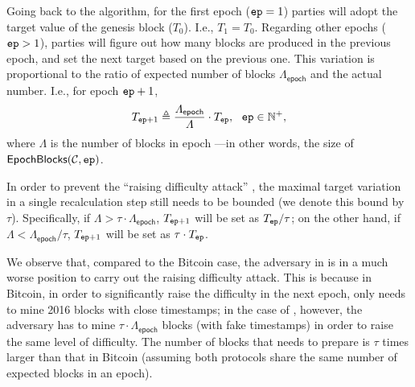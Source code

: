 Going back to the algorithm, for the first epoch ($\mathtt{ep}  = 1$) parties will adopt the target value of the genesis block ($T_0$). I.e., $T_ 1 = T_ 0$.
%
Regarding other epochs ($\mathtt{ep} > 1$), parties will figure out how many blocks are produced in the previous epoch, and set the next target based on the previous one.
%
This variation is proportional to the ratio of expected number of blocks $\varLambda_{\mathsf{epoch}}$ and the actual number.
%
I.e., for epoch $\mathtt{ep} + 1$,
%
\begin{equation} \label{eq:next-target}
    T_{\mathtt{ep} + 1} \triangleq \frac{\varLambda_{\mathsf{epoch}}}{\varLambda} \cdot T_\mathtt{ep}, ~~ \mathtt{ep} \in \mathbb{N}^+,
\end{equation}
%
where $\varLambda$ is the number of blocks in epoch \epoch---in other words, the size of $\mathsf{EpochBlocks}(\mathcal{C}, \mathtt{ep})$.

In order to prevent the ``raising difficulty attack'' \cite{EPRINT:Bahack13}, the maximal target variation in a single recalculation step still needs to be bounded (we denote this bound by $\tau$).
%
Specifically, if $\varLambda > \tau \cdot \varLambda_{\mathsf{epoch}}$, $T_{\mathtt{ep} + 1}$ will be set as $T_\mathtt{ep} / \tau$; on the other hand, if $\varLambda < \varLambda_{\mathsf{epoch}} / \tau$, $T_{\mathtt{ep} + 1}$ will be set as $\tau \cdot T_\mathtt{ep}$.

\begin{remark}
    We observe that, compared to the Bitcoin case, the adversary \adv in \timekeeper is in a much worse position to carry out the raising difficulty attack.
    This is because in Bitcoin, in order to significantly raise the difficulty in the next epoch, \adv only needs to mine 2016 blocks with close timestamps; in the case of \timekeeper, however, the adversary has to mine $\tau \cdot \varLambda_{\mathsf{epoch}}$ blocks (with fake timestamps) in order to raise the same level of difficulty.
    The number of blocks that \adv needs to prepare is $\tau$ times larger than that in Bitcoin (assuming both protocols share the same number of expected blocks in an epoch).
\end{remark}
